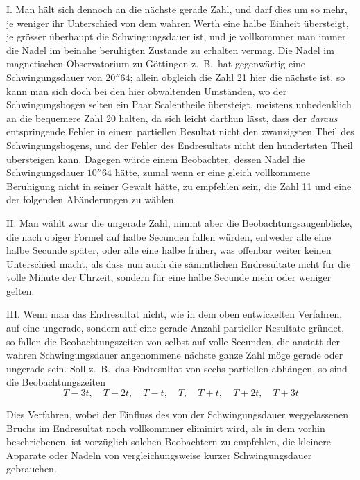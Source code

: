 I. Man hält sich dennoch an die nächste gerade Zahl, und darf dies um so mehr, je weniger ihr Unterschied von dem wahren Werth eine halbe Einheit übersteigt, je grösser überhaupt die Schwingungsdauer ist, und je vollkommner man immer die Nadel im beinahe beruhigten Zustande zu erhalten vermag. Die Nadel im magnetischen Observatorium zu Göttingen z.\ B.\ hat gegenwärtig eine Schwingungsdauer von $20''64$; allein obgleich die Zahl 21 hier die nächste ist, so kann man sich doch bei den hier obwaltenden Umständen, wo der Schwingungsbogen selten ein Paar Scalentheile übersteigt, meistens unbedenklich an die bequemere Zahl 20 halten, da sich leicht darthun lässt, dass der \textit{daraus} entspringende Fehler in einem partiellen Resultat nicht den zwanzigsten Theil des Schwingungsbogens, und der Fehler des Endresultats nicht den hundertsten Theil übersteigen kann. Dagegen würde einem Beobachter, dessen Nadel die Schwingungsdauer $10''64$ hätte, zumal wenn er eine gleich vollkommene Beruhigung nicht in seiner Gewalt hätte, zu empfehlen sein, die Zahl 11 und eine der folgenden Abänderungen zu wählen.

II. Man wählt zwar die ungerade Zahl, nimmt aber die Beobachtungsaugenblicke, die nach obiger Formel auf halbe Secunden fallen würden, entweder alle eine halbe Secunde später, oder alle eine halbe früher, was offenbar weiter keinen Unterschied macht, als dass nun auch die sämmtlichen Endresultate nicht für die volle Minute der Uhrzeit, sondern für eine halbe Secunde mehr oder weniger gelten.

III. Wenn man das Endresultat nicht, wie in dem oben entwickelten Verfahren, auf eine ungerade, sondern auf eine gerade Anzahl partieller Resultate gründet, so fallen die Beobachtungszeiten von selbst auf volle Secunden, die anstatt der wahren Schwingungsdauer angenommene nächste ganze Zahl möge gerade oder ungerade sein. Soll z.\ B.\ das Endresultat von sechs partiellen abhängen, so sind die Beobachtungszeiten
\[
T-3t,\quad T-2t,\quad T-t,\quad T,\quad T+t,\quad T+2t,\quad T+3t
\]

Dies Verfahren, wobei der Einfluss des von der Schwingungsdauer weggelassenen Bruchs im Endresultat noch vollkommner eliminirt wird, als in dem vorhin beschriebenen, ist vorzüglich solchen Beobachtern zu empfehlen, die kleinere Apparate oder Nadeln von vergleichungsweise kurzer Schwingungsdauer gebrauchen.

